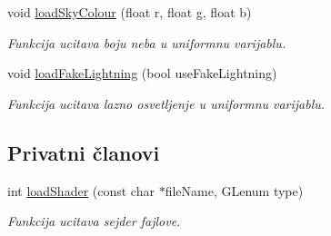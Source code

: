 \begin{DoxyCompactItemize}
void \hyperlink{classshader_1_1AnimatedModelShader_a8620f9e60fd34192c2b63a4207589930}{load\+Sky\+Colour} (float r, float g, float b)
\begin{DoxyCompactList}\small\item\em Funkcija ucitava boju neba u uniformnu varijablu. \end{DoxyCompactList}\item 
void \hyperlink{classshader_1_1AnimatedModelShader_afbf5ce0c44c1d9ab564dd19a6398a088}{load\+Fake\+Lightning} (bool use\+Fake\+Lightning)
\begin{DoxyCompactList}\small\item\em Funkcija ucitava lazno osvetljenje u uniformnu varijablu. \end{DoxyCompactList}\end{DoxyCompactItemize}
\subsection*{Privatni članovi}
\begin{DoxyCompactItemize}
\item 
int \hyperlink{classshader_1_1AnimatedModelShader_ae6e4523ce0246b3ff0cd0e2ee86cfc7b}{load\+Shader} (const char $\ast$file\+Name, G\+Lenum type)
\begin{DoxyCompactList}\small\item\em Funkcija ucitava sejder fajlove. \end{DoxyCompactList}\end{DoxyCompactItemize}
